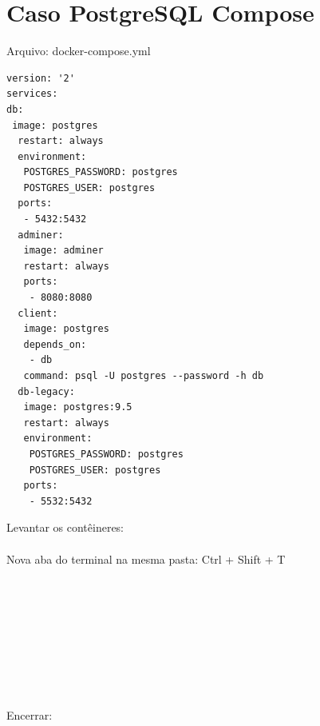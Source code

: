 \documentclass[a4paper,11pt]{article}
\begin{document}
\section{Caso PostgreSQL Compose}
Arquivo: docker-compose.yml
\begin{lstlisting}[]
version: '2'
services:
db:
 image: postgres
  restart: always
  environment:
   POSTGRES_PASSWORD: postgres
   POSTGRES_USER: postgres
  ports:
   - 5432:5432
  adminer:
   image: adminer
   restart: always
   ports:
    - 8080:8080
  client:
   image: postgres
   depends_on:
    - db
   command: psql -U postgres --password -h db
  db-legacy:
   image: postgres:9.5
   restart: always
   environment:
    POSTGRES_PASSWORD: postgres
    POSTGRES_USER: postgres
   ports:
    - 5532:5432
\end{lstlisting}
Levantar os contêineres: \\
 \\[2mm]
Nova aba do terminal na mesma pasta: Ctrl + Shift + T
 \\
 \\
 \\
 \\
 \\
 \\
 \\
 \\
 \\
 \\[2mm]
Encerrar: \\
\end{document}

